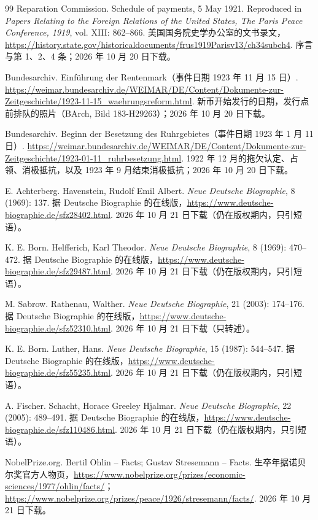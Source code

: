 \begin{thebibliography}{99}
 Reparation Commission. Schedule of payments, 5 May 1921. Reproduced in \emph{Papers Relating to the Foreign Relations of the United States, The Paris Peace Conference, 1919}, vol. XIII: 862--866. 美国国务院史学办公室的文书录文，\url{https://history.state.gov/historicaldocuments/frus1919Parisv13/ch34subch4}. 序言与第 1、2、4 条；2026 年 10 月 20 日下载。

 Bundesarchiv. Einführung der Rentenmark（事件日期 1923 年 11 月 15 日）. \url{https://weimar.bundesarchiv.de/WEIMAR/DE/Content/Dokumente-zur-Zeitgeschichte/1923-11-15_waehrungsreform.html}. 新币开始发行的日期，发行点前排队的照片（BArch, Bild 183-H29263）；2026 年 10 月 20 日下载。

 Bundesarchiv. Beginn der Besetzung des Ruhrgebietes（事件日期 1923 年 1 月 11 日）. \url{https://weimar.bundesarchiv.de/WEIMAR/DE/Content/Dokumente-zur-Zeitgeschichte/1923-01-11_ruhrbesetzung.html}. 1922 年 12 月的拖欠认定、占领、消极抵抗，以及 1923 年 9 月结束消极抵抗；2026 年 10 月 20 日下载。

 E. Achterberg. Havenstein, Rudolf Emil Albert. \emph{Neue Deutsche Biographie}, 8 (1969): 137. 据 Deutsche Biographie 的在线版，\url{https://www.deutsche-biographie.de/sfz28402.html}. 2026 年 10 月 21 日下载（仍在版权期内，只引短语）。

 K. E. Born. Helfferich, Karl Theodor. \emph{Neue Deutsche Biographie}, 8 (1969): 470--472. 据 Deutsche Biographie 的在线版，\url{https://www.deutsche-biographie.de/sfz29487.html}. 2026 年 10 月 21 日下载（仍在版权期内，只引短语）。

 M. Sabrow. Rathenau, Walther. \emph{Neue Deutsche Biographie}, 21 (2003): 174--176. 据 Deutsche Biographie 的在线版，\url{https://www.deutsche-biographie.de/sfz52310.html}. 2026 年 10 月 21 日下载（只转述）。

 K. E. Born. Luther, Hans. \emph{Neue Deutsche Biographie}, 15 (1987): 544--547. 据 Deutsche Biographie 的在线版，\url{https://www.deutsche-biographie.de/sfz55235.html}. 2026 年 10 月 21 日下载（仍在版权期内，只引短语）。

 A. Fischer. Schacht, Horace Greeley Hjalmar. \emph{Neue Deutsche Biographie}, 22 (2005): 489--491. 据 Deutsche Biographie 的在线版，\url{https://www.deutsche-biographie.de/sfz110486.html}. 2026 年 10 月 21 日下载（仍在版权期内，只引短语）。

 NobelPrize.org. Bertil Ohlin -- Facts; Gustav Stresemann -- Facts. 生卒年据诺贝尔奖官方人物页，\url{https://www.nobelprize.org/prizes/economic-sciences/1977/ohlin/facts/}；\url{https://www.nobelprize.org/prizes/peace/1926/stresemann/facts/}. 2026 年 10 月 21 日下载。


\end{thebibliography}
